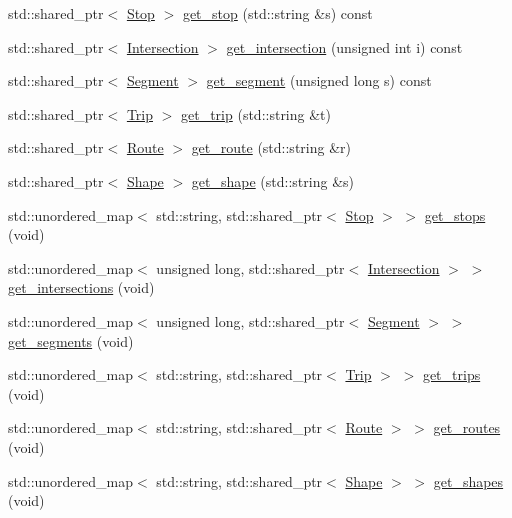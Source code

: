 \begin{DoxyCompactItemize}
\item 
std\+::shared\+\_\+ptr$<$ \hyperlink{classgtfs_1_1Stop}{Stop} $>$ \hyperlink{classgtfs_1_1GTFS_a860f598fdd39e238cae2a446826ede7b}{get\+\_\+stop} (std\+::string \&s) const 
\item 
std\+::shared\+\_\+ptr$<$ \hyperlink{classgtfs_1_1Intersection}{Intersection} $>$ \hyperlink{classgtfs_1_1GTFS_ac5cc16f11c4e0db3d2003e591e4d79a5}{get\+\_\+intersection} (unsigned int i) const 
\item 
std\+::shared\+\_\+ptr$<$ \hyperlink{classgtfs_1_1Segment}{Segment} $>$ \hyperlink{classgtfs_1_1GTFS_aaa171ddb8e40baa60375a0d1f171941e}{get\+\_\+segment} (unsigned long s) const 
\item 
std\+::shared\+\_\+ptr$<$ \hyperlink{classgtfs_1_1Trip}{Trip} $>$ \hyperlink{classgtfs_1_1GTFS_a4aeffca4aa9bed086fe99166f1e9ebe7}{get\+\_\+trip} (std\+::string \&t)
\item 
std\+::shared\+\_\+ptr$<$ \hyperlink{classgtfs_1_1Route}{Route} $>$ \hyperlink{classgtfs_1_1GTFS_ae2363b2b77498cf0096f81b2d848e17b}{get\+\_\+route} (std\+::string \&r)
\item 
std\+::shared\+\_\+ptr$<$ \hyperlink{classgtfs_1_1Shape}{Shape} $>$ \hyperlink{classgtfs_1_1GTFS_af370a41d67e8978da1c6243279c70919}{get\+\_\+shape} (std\+::string \&s)
\item 
std\+::unordered\+\_\+map$<$ std\+::string, std\+::shared\+\_\+ptr$<$ \hyperlink{classgtfs_1_1Stop}{Stop} $>$ $>$ \hyperlink{classgtfs_1_1GTFS_a33a81248120e12d5a5d52a92821b827e}{get\+\_\+stops} (void)
\item 
std\+::unordered\+\_\+map$<$ unsigned long, std\+::shared\+\_\+ptr$<$ \hyperlink{classgtfs_1_1Intersection}{Intersection} $>$ $>$ \hyperlink{classgtfs_1_1GTFS_a132b9a970f4ff1c04fd30a69fc1815a0}{get\+\_\+intersections} (void)
\item 
std\+::unordered\+\_\+map$<$ unsigned long, std\+::shared\+\_\+ptr$<$ \hyperlink{classgtfs_1_1Segment}{Segment} $>$ $>$ \hyperlink{classgtfs_1_1GTFS_ae124db38217498c5e1090447ccf11953}{get\+\_\+segments} (void)
\item 
std\+::unordered\+\_\+map$<$ std\+::string, std\+::shared\+\_\+ptr$<$ \hyperlink{classgtfs_1_1Trip}{Trip} $>$ $>$ \hyperlink{classgtfs_1_1GTFS_ad526fc627fe1ce81b8a669f6187be0c0}{get\+\_\+trips} (void)
\item 
std\+::unordered\+\_\+map$<$ std\+::string, std\+::shared\+\_\+ptr$<$ \hyperlink{classgtfs_1_1Route}{Route} $>$ $>$ \hyperlink{classgtfs_1_1GTFS_aef6a88c15cdf8bf788e41c81a14ecc76}{get\+\_\+routes} (void)
\item 
std\+::unordered\+\_\+map$<$ std\+::string, std\+::shared\+\_\+ptr$<$ \hyperlink{classgtfs_1_1Shape}{Shape} $>$ $>$ \hyperlink{classgtfs_1_1GTFS_a91ada6a3f02e3ee9b6a723a6c6fc50af}{get\+\_\+shapes} (void)
\end{DoxyCompactItemize}


